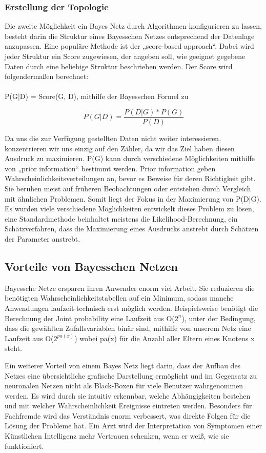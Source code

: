 \subsubsection{Erstellung der Topologie}
Die zweite Möglichkeit ein Bayes Netz durch Algorithmen konfigurieren zu lassen, besteht darin die Struktur eines Bayesschen
Netzes entsprechend der Datenlage anzupassen.
Eine populäre Methode ist der „score-based approach“. Dabei wird jeder Struktur ein Score zugewiesen, der angeben soll, wie geeignet
gegebene Daten durch eine beliebige Struktur beschrieben werden. Der Score wird folgendermaßen berechnet:\\
\\
P(G|D) = Score(G, D),
mithilfe der Bayesschen Formel zu

\begin{equation}
 P(G|D) = \frac{{P(D|G) * P(G)}}{{P(D)}}
\end{equation}

Da uns die zur Verfügung gestellten Daten nicht weiter interessieren, konzentrieren wir uns einzig auf den Zähler, da wir das Ziel
haben diesen Ausdruck zu maximieren.
P(G) kann durch verschiedene Möglichkeiten mithilfe von „prior information“ bestimmt werden.
Prior information geben Wahrscheinlichkeitsverteilungen an,  bevor es Beweise für deren Richtigkeit gibt. Sie beruhen meist auf
früheren Beobachtungen oder entstehen durch Vergleich mit ähnlichen Problemen.
Somit liegt der Fokus in der Maximierung von P(D|G). Es wurden viele verschiedene Möglichkeiten entwickelt dieses Problem zu
lösen, eine Standardmethode beinhaltet meistens die Likelihood-Berechnung, ein Schätzverfahren, dass die Maximierung eines
Ausdrucks anstrebt durch  Schätzen der Parameter anstrebt. 



\subsection{Vorteile von Bayesschen Netzen}			
Bayessche Netze ersparen ihren Anwender enorm viel Arbeit. Sie reduzieren die benötigten Wahrscheinlichkeitstabellen auf ein Minimum,
sodass manche Anwendungen laufzeit-technisch erst möglich werden.
Beispielsweise benötigt die Berechnung der Joint probability eine Laufzeit aus O($2^{n}$), unter der Bedingung, dass die gewählten
Zufallsvariablen binär sind, mithilfe von unserem Netz eine Laufzeit aus O($2^{pa(x)}$) wobei pa(x) für die Anzahl aller Eltern eines
Knotens x steht. 

Ein weiterer Vorteil von einem Bayes Netz liegt darin, dass der Aufbau des Netzes eine übersichtliche grafische Darstellung
ermöglicht und im Gegensatz zu neuronalen Netzen nicht als Black-Boxen für viele Benutzer wahrgenommen werden. Es wird durch sie
intuitiv erkennbar, welche Abhängigkeiten bestehen und mit welcher Wahrscheinlichkeit Ereignisse eintreten werden. Besonders für
Fachfremde wird das Verständnis enorm verbessert, was direkte Folgen für die Lösung der Probleme hat. Ein Arzt wird der Interpretation
von Symptomen einer Künstlichen Intelligenz mehr Vertrauen schenken, wenn er weiß, wie sie funktioniert.

